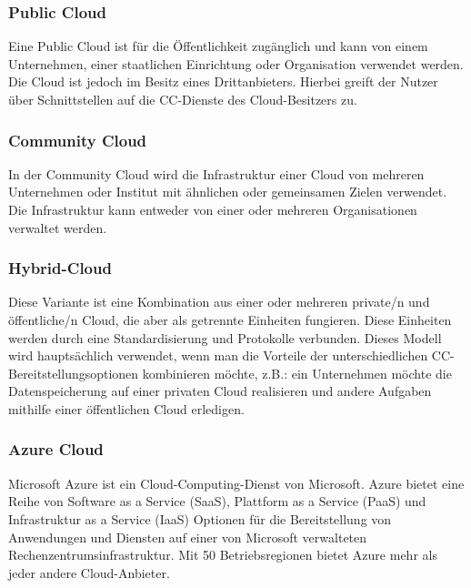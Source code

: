 \subsubsection{Public Cloud}

Eine Public Cloud ist für die Öffentlichkeit zugänglich und kann von einem Unternehmen, einer staatlichen Einrichtung oder Organisation verwendet werden. Die Cloud ist jedoch im Besitz eines Drittanbieters. Hierbei greift der Nutzer über Schnittstellen auf die CC-Dienste des Cloud-Besitzers zu.

\subsubsection{Community Cloud}

In der Community Cloud wird die Infrastruktur einer Cloud von mehreren Unternehmen oder Institut mit ähnlichen oder gemeinsamen Zielen verwendet. Die Infrastruktur kann entweder von einer oder mehreren Organisationen verwaltet werden.

\subsubsection{Hybrid-Cloud}

Diese Variante ist eine Kombination aus einer oder mehreren private/n und öffentliche/n Cloud, die aber als getrennte Einheiten fungieren. Diese Einheiten werden durch eine Standardisierung und Protokolle verbunden. Dieses Modell wird hauptsächlich verwendet, wenn man die Vorteile der unterschiedlichen CC-Bereitstellungsoptionen kombinieren möchte, z.B.:  ein Unternehmen möchte die Datenspeicherung auf einer privaten Cloud realisieren und andere Aufgaben mithilfe einer öffentlichen Cloud erledigen.

\subsubsection{Azure Cloud}

Microsoft Azure ist ein Cloud-Computing-Dienst von Microsoft. Azure bietet eine Reihe von Software as a Service (SaaS), Plattform as a Service (PaaS) und Infrastruktur as a Service (IaaS) Optionen für die Bereitstellung von Anwendungen und Diensten auf einer von Microsoft verwalteten Rechenzentrumsinfrastruktur. Mit 50 Betriebsregionen bietet Azure mehr als jeder andere Cloud-Anbieter.


